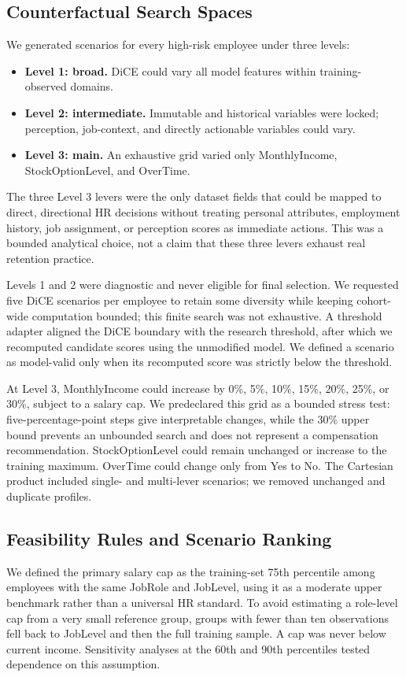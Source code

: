 \documentclass[11pt]{article}
\begin{document}
\subsection{Counterfactual Search Spaces}
We generated scenarios for every high-risk employee under three levels:
\begin{itemize}[leftmargin=*,label={}]
  \item \textbf{Level 1: broad.} DiCE could vary all model features within training-observed domains.
  \item \textbf{Level 2: intermediate.} Immutable and historical variables were locked; perception, job-context, and directly actionable variables could vary.
  \item \textbf{Level 3: main.} An exhaustive grid varied only MonthlyIncome, StockOptionLevel, and OverTime.
\end{itemize}
The three Level 3 levers were the only dataset fields that could be mapped to direct, directional HR decisions without treating personal attributes, employment history, job assignment, or perception scores as immediate actions. This was a bounded analytical choice, not a claim that these three levers exhaust real retention practice.

Levels 1 and 2 were diagnostic and never eligible for final selection. We requested five DiCE scenarios per employee to retain some diversity while keeping cohort-wide computation bounded; this finite search was not exhaustive. A threshold adapter aligned the DiCE boundary with the research threshold, after which we recomputed candidate scores using the unmodified model. We defined a scenario as model-valid only when its recomputed score was strictly below the threshold.

At Level 3, MonthlyIncome could increase by 0\%, 5\%, 10\%, 15\%, 20\%, 25\%, or 30\%, subject to a salary cap. We predeclared this grid as a bounded stress test: five-percentage-point steps give interpretable changes, while the 30\% upper bound prevents an unbounded search and does not represent a compensation recommendation. StockOptionLevel could remain unchanged or increase to the training maximum. OverTime could change only from Yes to No. The Cartesian product included single- and multi-lever scenarios; we removed unchanged and duplicate profiles.

\subsection{Feasibility Rules and Scenario Ranking}
We defined the primary salary cap as the training-set 75th percentile among employees with the same JobRole and JobLevel, using it as a moderate upper benchmark rather than a universal HR standard. To avoid estimating a role-level cap from a very small reference group, groups with fewer than ten observations fell back to JobLevel and then the full training sample. A cap was never below current income. Sensitivity analyses at the 60th and 90th percentiles tested dependence on this assumption.
\end{document}

